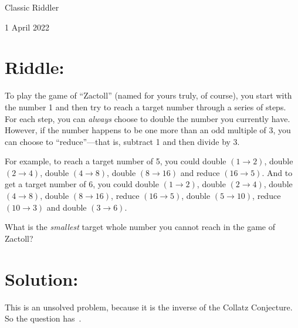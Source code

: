 \documentclass{article}
\begin{document}
\pagestyle{empty} %

\begin{center}
{\LARGE Classic Riddler}

\vspace{0.15in}

{\Large 1 April 2022}
\end{center}


\section*{Riddle:}

To play the game of ``Zactoll'' (named for yours truly, of course), you start with the number 1 and then try to reach a target number through a series of steps.
For each step, you can \textit{always} choose to double the number you currently have.
However, if the number happens to be one more than an odd multiple of 3, you can choose to ``reduce''---that is, subtract 1 and then divide by 3.

For example, to reach a target number of 5, you could double $(1\rightarrow2)$, double $(2\rightarrow4)$, double $(4\rightarrow8)$, double $(8\rightarrow16)$ and reduce $(16\rightarrow5)$.
And to get a target number of 6, you could double $(1\rightarrow2)$, double $(2\rightarrow4)$, double $(4\rightarrow8)$, double $(8\rightarrow16)$, reduce $(16\rightarrow5)$, double $(5\rightarrow10)$, reduce $(10\rightarrow3)$ and double $(3\rightarrow6)$.

What is the \textit{smallest} target whole number you cannot reach in the game of Zactoll?


\section*{Solution:}

This is an unsolved problem, because it is the inverse of the Collatz Conjecture.
So the question has \,.
\end{document}
